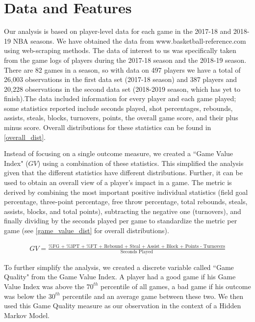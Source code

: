 \documentclass[12pt, authoryear]{elsarticle}
\begin{document}
\section{Data and Features}

Our analysis is based on player-level data for each game in the 2017-18 and 2018-19 NBA seasons. We have obtained the data from www.basketball-reference.com using web-scraping methods. The data of interest to us was specifically taken from the game logs of players during the 2017-18 season and the 2018-19 season. There are 82 games in a season, so with data on 497 players we have a total of 26,003 observations in the first data set (2017-18 season) and 387 players and 20,228 observations in the second data set (2018-2019 season, which has yet to finish).The data included information for every player and each game played; some statistics reported include seconds played, shot percentages, rebounds, assists, steals, blocks, turnovers, points, the overall game score, and their plus minus score. Overall distributions for these statistics can be found in \ref{overall_dist}.

Instead of focusing on a single outcome measure, we created a ``Game Value Index" ($GV$) using a combination of these statistics. This simplified the analysis given that the different statistics have different distributions. Further, it can be used to obtain an overall view of a player's impact in a game. The metric is derived by combining the most important positive individual statistics (field goal percentage, three-point percentage, free throw percentage, total rebounds, steals, assists, blocks, and total points), subtracting the negative one (turnovers), and finally dividing by the seconds played per game to standardize the metric per game (see \ref{game_value_dist} for overall distributions).

\begin{align*}
GV = \frac{\text{\%FG + \%3PT + \%FT + Rebound + Steal + Assist +  Block + Points - Turnovers}}{\text{Seconds Played}}
\end{align*} 

To further simplify the analysis, we created a discrete variable called ``Game Quality" from the Game Value Index. A player had a good game if his Game Value Index was above the $70^{th}$ percentile of all games, a bad game if his outcome was below the $30^{th}$ percentile and an average game between these two. We then used this Game Quality measure as our observation in the context of a Hidden Markov Model.
\end{document}
